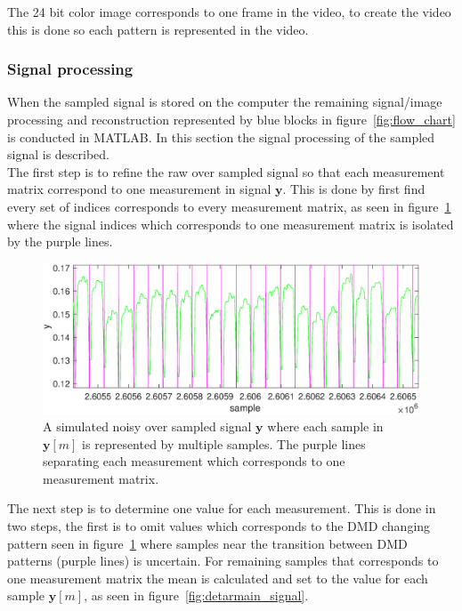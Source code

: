 The 24 bit color image corresponds to one frame in the video, to create the video this is done so each pattern is represented in the video.



\subsubsection{Signal processing}
\label{sec:signal_process}  
When the sampled signal is stored on the computer the remaining signal/image processing and reconstruction represented by blue blocks in figure~\ref{fig:flow_chart} is conducted in MATLAB. In this section the signal processing of the sampled signal is described.\\[0.1in]

The first step is to refine the raw over sampled signal so that each measurement matrix correspond to one measurement in signal $\mathbf{y}$. This is done by first find every set of indices corresponds to every measurement matrix, as seen in figure~\ref{fig:raw_signal} where the signal indices which corresponds to one measurement matrix is isolated by the purple lines.


\begin{figure}[H]
\includegraphics[width = 1\linewidth]{gfx/signal_proc/isolated_raw_signal.eps}
\caption{A simulated noisy over sampled signal $\mathbf{y}$ where each sample in $\mathbf{y}[m]$ is represented by multiple samples. The purple lines separating each measurement which corresponds to one measurement matrix.}
	\label{fig:raw_signal}
\end{figure}

The next step is to determine one value for each measurement. This is done in two steps, the first is to omit values which corresponds to the DMD changing pattern seen in figure~\ref{fig:raw_signal} where samples near the transition between DMD patterns (purple lines) is uncertain. For remaining samples that corresponds to one measurement matrix the mean is calculated and set to the value for each sample $\mathbf{y}[m]$, as seen in figure~\ref{fig:detarmain_signal}. 

